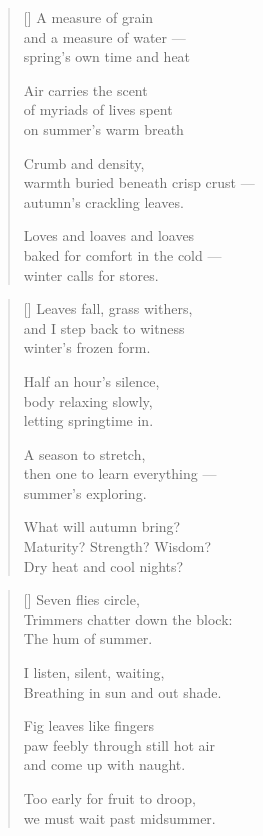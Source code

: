 \begin{verse}[\textwidth]
  A measure of grain\\
  and a measure of water ---\\
  spring's own time and heat

  Air carries the scent\\
  of myriads of lives spent\\
  on summer's warm breath

  Crumb and density,\\
  warmth buried beneath crisp crust ---\\
  autumn's crackling leaves.

  Loves and loaves and loaves\\
  baked for comfort in the cold ---\\
  winter calls for stores.
\end{verse}

\newpage

\begin{verse}[\textwidth]
  Leaves fall, grass withers,\\
  and I step back to witness\\
  winter's frozen form.

  Half an hour's silence,\\
  body relaxing slowly,\\
  letting springtime in.

  A season to stretch,\\
  then one to learn everything ---\\
  summer's exploring.

  What will autumn bring?\\
  Maturity? Strength? Wisdom?\\
  Dry heat and cool nights?
\end{verse}

\newpage

\begin{verse}[\textwidth]
    Seven flies circle,\\
    Trimmers chatter down the block:\\
    The hum of summer.

    \vin I listen, silent, waiting,\\
    \vin Breathing in sun and out shade.

    Fig leaves like fingers\\
    paw feebly through still hot air\\
    and come up with naught.

    \vin Too early for fruit to droop,\\
    \vin we must wait past midsummer.
\end{verse}
